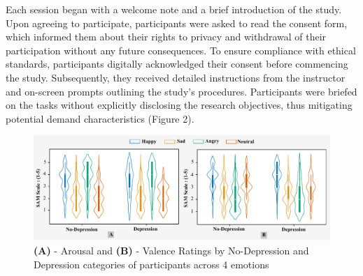 \documentclass{Interspeech2024}
\begin{document}
Each session began with a welcome note and a brief introduction of the study. Upon agreeing to participate, participants were asked to read the consent form, which informed them about their rights to privacy and withdrawal of their participation without any future consequences. To ensure compliance with ethical standards, participants digitally acknowledged their consent before commencing the study. %
Subsequently, they received detailed instructions from the instructor and on-screen prompts outlining the study's procedures. Participants were briefed on the tasks without explicitly disclosing the research objectives, thus mitigating potential demand characteristics (Figure 2).




  



\begin{figure}[t!] %
  \centering
  \includegraphics[width=\textwidth]{val_arous_phq_violin_no_fill.pdf}
  \caption{\textbf{(A)} - Arousal and \textbf{(B)} - Valence Ratings by No-Depression and Depression categories of participants across 4 emotions}
  \label{fig:your_label}
\end{figure}
\end{document}
